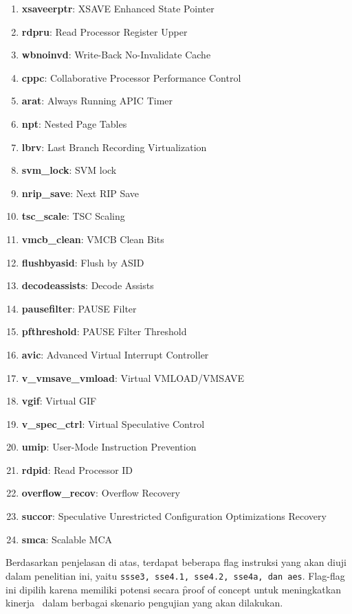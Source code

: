 \begin{multicols}{2}
\begin{enumerate}
        \item \textbf{xsaveerptr}: XSAVE Enhanced State Pointer
        \item \textbf{rdpru}: Read Processor Register Upper
        \item \textbf{wbnoinvd}: Write-Back No-Invalidate Cache
        \item \textbf{cppc}: Collaborative Processor Performance Control
        \item \textbf{arat}: Always Running APIC Timer
        \item \textbf{npt}: Nested Page Tables
        \item \textbf{lbrv}: Last Branch Recording Virtualization
        \item \textbf{svm\_lock}: SVM lock
        \item \textbf{nrip\_save}: Next RIP Save
        \item \textbf{tsc\_scale}: TSC Scaling
        \item \textbf{vmcb\_clean}: VMCB Clean Bits
        \item \textbf{flushbyasid}: Flush by ASID
        \item \textbf{decodeassists}: Decode Assists
        \item \textbf{pausefilter}: PAUSE Filter
        \item \textbf{pfthreshold}: PAUSE Filter Threshold
        \item \textbf{avic}: Advanced Virtual Interrupt Controller
        \item \textbf{v\_vmsave\_vmload}: Virtual VMLOAD/VMSAVE
        \item \textbf{vgif}: Virtual GIF
        \item \textbf{v\_spec\_ctrl}: Virtual Speculative Control
        \item \textbf{umip}: User-Mode Instruction Prevention
        \item \textbf{rdpid}: Read Processor ID
        \item \textbf{overflow\_recov}: Overflow Recovery
        \item \textbf{succor}: Speculative Unrestricted Configuration Optimizations Recovery
        \item \textbf{smca}: Scalable MCA
    \end{enumerate}
\end{multicols}

Berdasarkan penjelasan di atas, terdapat beberapa flag instruksi yang akan diuji dalam penelitian ini, yaitu \texttt{ssse3, sse4.1, sse4.2, sse4a, dan aes}. Flag-flag ini dipilih karena memiliki potensi secara \f{proof of concept} untuk meningkatkan kinerja \vm\ dalam berbagai skenario pengujian yang akan dilakukan.

